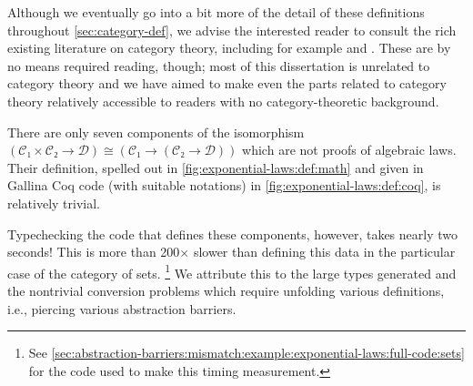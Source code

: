 Although we eventually go into a bit more of the detail of these definitions throughout \autoref{sec:category-def}, we advise the interested reader to consult the rich existing literature on category theory, including for example \textcite{awodey2010category} and \textcite{mac1998categories}.
These are by no means required reading, though;
most of this dissertation is unrelated to category theory and we have aimed to make even the parts related to category theory relatively accessible to readers with no category-theoretic background.

There are only seven components of the isomorphism $(\mathcal C₁ × \mathcal C₂ → \mathcal D) ≅ (\mathcal C₁ → (\mathcal C₂ → \mathcal D))$ which are not proofs of algebraic laws.
Their definition, spelled out in \autoref{fig:exponential-laws:def:math} and given in Gallina Coq code (with suitable notations) in \autoref{fig:exponential-laws:def:coq}, is relatively trivial.

Typechecking the code that defines these components, however, takes nearly two seconds!
This is more than 200$\times$ slower than defining this data in the particular case of the category of sets.%
\footnote{%
  See \autoref{sec:abstraction-barriers:mismatch:example:exponential-laws:full-code:sets} for the code used to make this timing measurement.%
}
We attribute this to the large types generated and the nontrivial conversion problems which require unfolding various definitions, i.e., piercing various abstraction barriers.

